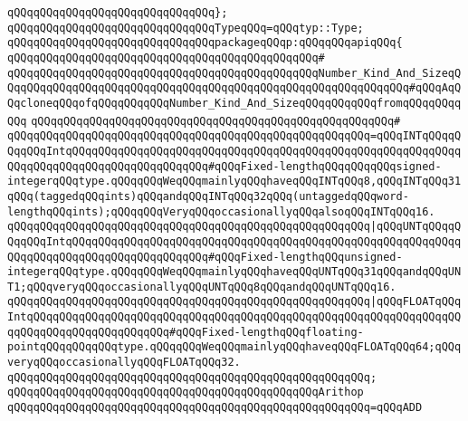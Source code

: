 \verb|qQQqqQQqqQQqqQQqqQQqqQQqqQQqqQQq};|\newline
\verb|qQQqqQQqqQQqqQQqqQQqqQQqqQQqqQQqTypeqQQq=qQQqtyp::Type;|\newline
\newline
\verb|qQQqqQQqqQQqqQQqqQQqqQQqqQQqqQQqpackageqQQqp:qQQqqQQqapiqQQq{|\newline
\verb|qQQqqQQqqQQqqQQqqQQqqQQqqQQqqQQqqQQqqQQqqQQqqQQq#|\newline
\verb|qQQqqQQqqQQqqQQqqQQqqQQqqQQqqQQqqQQqqQQqqQQqqQQqNumber_Kind_And_SizeqQQqqQQqqQQqqQQqqQQqqQQqqQQqqQQqqQQqqQQqqQQqqQQqqQQqqQQqqQQqqQQq#qQQqAqQQqcloneqQQqofqQQqqQQqqQQqNumber_Kind_And_SizeqQQqqQQqqQQqfromqQQqqQQqqQQq|\newline
\verb|qQQqqQQqqQQqqQQqqQQqqQQqqQQqqQQqqQQqqQQqqQQqqQQqqQQqqQQq#|\newline
\verb|qQQqqQQqqQQqqQQqqQQqqQQqqQQqqQQqqQQqqQQqqQQqqQQqqQQqqQQq=qQQqINTqQQqqQQqqQQqIntqQQqqQQqqQQqqQQqqQQqqQQqqQQqqQQqqQQqqQQqqQQqqQQqqQQqqQQqqQQqqQQqqQQqqQQqqQQqqQQqqQQqqQQqqQQq#qQQqFixed-lengthqQQqqQQqqQQqsigned-integerqQQqtype.qQQqqQQqWeqQQqmainlyqQQqhaveqQQqINTqQQq8,qQQqINTqQQq31qQQq(taggedqQQqints)qQQqandqQQqINTqQQq32qQQq(untaggedqQQqword-lengthqQQqints);qQQqqQQqVeryqQQqoccasionallyqQQqalsoqQQqINTqQQq16.|\newline
\verb|qQQqqQQqqQQqqQQqqQQqqQQqqQQqqQQqqQQqqQQqqQQqqQQqqQQqqQQq|\verb#|qQQqUNTqQQqqQQqqQQqIntqQQqqQQqqQQqqQQqqQQqqQQqqQQqqQQqqQQqqQQqqQQqqQQqqQQqqQQqqQQqqQQqqQQqqQQqqQQqqQQqqQQqqQQqqQQq#\verb|#qQQqFixed-lengthqQQqunsigned-integerqQQqtype.qQQqqQQqWeqQQqmainlyqQQqhaveqQQqUNTqQQq31qQQqandqQQqUNT1;qQQqveryqQQqoccasionallyqQQqUNTqQQq8qQQqandqQQqUNTqQQq16.|\newline
\verb|qQQqqQQqqQQqqQQqqQQqqQQqqQQqqQQqqQQqqQQqqQQqqQQqqQQqqQQq|\verb#|qQQqFLOATqQQqIntqQQqqQQqqQQqqQQqqQQqqQQqqQQqqQQqqQQqqQQqqQQqqQQqqQQqqQQqqQQqqQQqqQQqqQQqqQQqqQQqqQQqqQQqqQQq#\verb|#qQQqFixed-lengthqQQqfloating-pointqQQqqQQqqQQqtype.qQQqqQQqWeqQQqmainlyqQQqhaveqQQqFLOATqQQq64;qQQqveryqQQqoccasionallyqQQqFLOATqQQq32.|\newline
\verb|qQQqqQQqqQQqqQQqqQQqqQQqqQQqqQQqqQQqqQQqqQQqqQQqqQQqqQQq;|\newline
\newline
\verb|qQQqqQQqqQQqqQQqqQQqqQQqqQQqqQQqqQQqqQQqqQQqqQQqArithop|\newline
\verb|qQQqqQQqqQQqqQQqqQQqqQQqqQQqqQQqqQQqqQQqqQQqqQQqqQQqqQQq=qQQqADD|\newline
